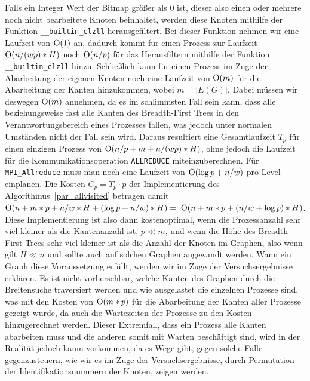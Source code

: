 \documentclass[11pt,a4paper]{article}
\begin{document}
Falls ein Integer Wert der Bitmap größer als 0 ist, dieser also einen oder mehrere noch nicht bearbeitete Knoten beinhaltet, werden diese Knoten mithilfe der Funktion \lstinline{__builtin_clzll} herausgefiltert. Bei dieser Funktion nehmen wir eine Laufzeit von \($O$(1)\) an, dadurch kommt für einen Prozess zur Laufzeit \($O$(n/(wp)*H)\) noch \($O$(n/p)\) für das Herausfiltern mithilfe der Funktion \lstinline{__builtin_clzll} hinzu. Schließlich kann für einen Prozess im Zuge der Abarbeitung der eigenen Knoten noch eine Laufzeit von \($O$(m)\) für die Abarbeitung der Kanten hinzukommen, wobei \(m = |E(G)|\). Dabei müssen wir deswegen \($O$(m)\) annehmen, da es im schlimmsten Fall sein kann, dass alle beziehungsweise fast alle Kanten des Breadth-First Trees in den Verantwortungsbereich eines Prozesses fallen, was jedoch unter normalen Umständen nicht der Fall sein wird. Daraus resultiert eine Gesamtlaufzeit \(T_{p}\) für einen einzigen Prozess von \($O$(n/p + m + n/(wp)*H)\), ohne jedoch die Laufzeit für die Kommunikationsoperation \lstinline{ALLREDUCE} miteinzuberechnen. Für \lstinline{MPI_Allreduce} muss man noch eine Laufzeit von \($O$(\log{p}+n/w)\) pro Level einplanen. Die Kosten \(C_{p} = T_{p} \cdot p\) der Implementierung des Algorithmus~\ref{par_allvisited} betragen damit \($O$(n + m*p + n/w*H + (\log{p}+n/w)*H) = \) \($O$(n + m*p + (n/w+\log{p})*H)\). Diese Implementierung ist also dann kostenoptimal, wenn die Prozessanzahl sehr viel kleiner als die Kantenanzahl ist, \(p \ll m\), und wenn die Höhe des Breadth-First Trees sehr viel kleiner ist als die Anzahl der Knoten im Graphen, also wenn gilt \(H \ll n\) und sollte auch auf solchen Graphen angewandt werden. Wann ein Graph diese Voraussetzung erfüllt, werden wir im Zuge der Versuchsergebnisse erklären. Es ist nicht vorhersehbar, welche Kanten des Graphen durch die Breitensuche traversiert werden und wie ausgelastet die einzelnen Prozesse sind, was mit den Kosten von \($O$(m*p)\) für die Abarbeitung der Kanten aller Prozesse gezeigt wurde, da auch die Wartezeiten der Prozesse zu den Kosten hinzugerechnet werden. Dieser Extremfall, dass ein Prozess alle Kanten abarbeiten muss und die anderen somit mit Warten beschäftigt sind, wird in der Realität jedoch kaum vorkommen, da es Wege gibt, gegen solche Fälle gegenzusteuern, wie wir es im Zuge der Versuchsergebnisse, durch Permutation der Identifikationsnummern der Knoten, zeigen werden.\\
\end{document}
